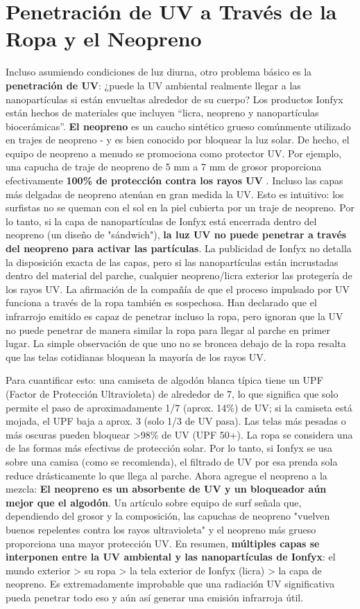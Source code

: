 \documentclass{article}
\begin{document}
\section{Penetración de UV a Través de la Ropa y el Neopreno}

Incluso asumiendo condiciones de luz diurna, otro problema básico es la \textbf{penetración de UV}: ¿puede la UV ambiental realmente llegar a las nanopartículas si están envueltas alrededor de su cuerpo? Los productos Ionfyx están hechos de materiales que incluyen “licra, neopreno y nanopartículas biocerámicas”. \textbf{El neopreno} es un caucho sintético grueso comúnmente utilizado en trajes de neopreno - y es bien conocido por bloquear la luz solar. De hecho, el equipo de neopreno a menudo se promociona como protector UV. Por ejemplo, una capucha de traje de neopreno de 5 mm a 7 mm de grosor proporciona efectivamente \textbf{100\% de protección contra los rayos UV} \cite{olas_peru_neopreno}. Incluso las capas más delgadas de neopreno atenúan en gran medida la UV. Esto es intuitivo: los surfistas no se queman con el sol en la piel cubierta por un traje de neopreno. Por lo tanto, si la capa de nanopartículas de Ionfyx está encerrada dentro del neopreno (un diseño de "sándwich"), \textbf{la luz UV no puede penetrar a través del neopreno para activar las partículas}. La publicidad de Ionfyx no detalla la disposición exacta de las capas, pero si las nanopartículas están incrustadas dentro del material del parche, cualquier neopreno/licra exterior las protegería de los rayos UV. La afirmación de la compañía de que el proceso impulsado por UV funciona a través de la ropa también es sospechosa. Han declarado que el infrarrojo emitido es capaz de penetrar incluso la ropa, pero ignoran que la UV no puede penetrar de manera similar la ropa para llegar al parche en primer lugar. La simple observación de que uno no se broncea debajo de la ropa resalta que las telas cotidianas bloquean la mayoría de los rayos UV.

Para cuantificar esto: una camiseta de algodón blanca típica tiene un UPF (Factor de Protección Ultravioleta) de alrededor de 7, lo que significa que solo permite el paso de aproximadamente 1/7 (aprox. 14\%) de UV; si la camiseta está mojada, el UPF baja a aprox. 3 (solo 1/3 de UV pasa). Las telas más pesadas o más oscuras pueden bloquear >98\% de UV (UPF 50+). La ropa se considera una de las formas más efectivas de protección solar. Por lo tanto, si Ionfyx se usa sobre una camisa (como se recomienda), el filtrado de UV por esa prenda sola reduce drásticamente lo que llega al parche. Ahora agregue el neopreno a la mezcla: \textbf{El neopreno es un absorbente de UV y un bloqueador aún mejor que el algodón}. Un artículo sobre equipo de surf señala que, dependiendo del grosor y la composición, las capuchas de neopreno "vuelven buenos repelentes contra los rayos ultravioleta" y el neopreno más grueso proporciona una mayor protección UV. En resumen, \textbf{múltiples capas se interponen entre la UV ambiental y las nanopartículas de Ionfyx}: el mundo exterior > su ropa > la tela exterior de Ionfyx (licra) > la capa de neopreno. Es extremadamente improbable que una radiación UV significativa pueda penetrar todo eso y aún así generar una emisión infrarroja útil.
\end{document}
